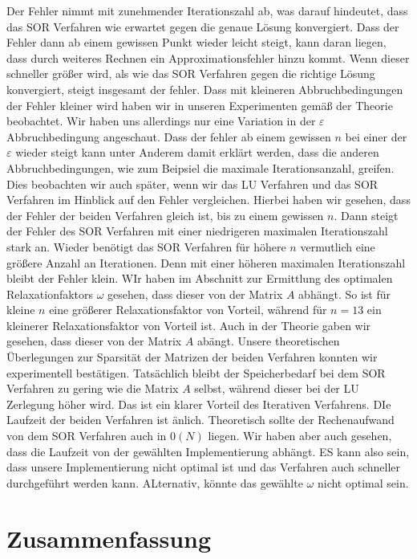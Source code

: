\documentclass[smallheadings]{scrartcl}
\theoremstyle{definition}
\begin{document}
Der Fehler nimmt mit zunehmender Iterationszahl ab, was darauf hindeutet, dass das SOR Verfahren wie erwartet gegen die genaue Lösung konvergiert. Dass der Fehler dann ab einem gewissen Punkt wieder leicht steigt, kann daran liegen, dass durch weiteres Rechnen ein Approximationsfehler hinzu kommt.  Wenn dieser schneller größer wird, als wie das SOR Verfahren gegen die richtige Lösung konvergiert, steigt insgesamt der fehler.  Dass mit kleineren Abbruchbedingungen der Fehler kleiner wird haben wir in unseren Experimenten gemäß der Theorie beobachtet.  Wir haben uns allerdings nur eine Variation in der $\varepsilon$ Abbruchbedingung angeschaut. Dass der fehler ab einem gewissen $n$ bei einer der $\varepsilon$ wieder steigt kann unter Anderem damit erklärt werden, dass die anderen Abbruchbedingungen, wie zum Beipsiel die maximale Iterationsanzahl, greifen. Dies beobachten wir auch später, wenn wir das LU Verfahren und das SOR Verfahren im Hinblick auf den Fehler vergleichen. Hierbei haben wir gesehen, dass der Fehler der beiden Verfahren gleich ist,  bis zu einem gewissen $n$. Dann steigt der Fehler des SOR Verfahren mit einer niedrigeren maximalen Iterationszahl stark an.  Wieder benötigt das SOR Verfahren für höhere $n$ vermutlich eine größere Anzahl an Iterationen. Denn mit einer höheren maximalen Iterationszahl bleibt der Fehler klein. WIr haben im Abschnitt zur Ermittlung des optimalen Relaxationfaktors $\omega$ gesehen, dass dieser von der Matrix $A$ abhängt. So ist für kleine $n$ eine größerer Relaxationsfaktor von Vorteil, während für $n=13$ ein kleinerer Relaxationsfaktor von Vorteil ist. Auch in der Theorie gaben wir gesehen, dass dieser von der Matrix $A$ abängt.  Unsere theoretischen Überlegungen zur Sparsität der Matrizen der beiden Verfahren konnten wir experimentell bestätigen. Tatsächlich bleibt der Speicherbedarf bei dem SOR Verfahren zu gering wie die Matrix $A$ selbst, während dieser bei der LU Zerlegung höher wird. Das ist ein klarer Vorteil des Iterativen Verfahrens. DIe Laufzeit der beiden Verfahren ist änlich. Theoretisch sollte der Rechenaufwand von dem SOR Verfahren auch in $\mathcal{0}(N)$ liegen. Wir haben aber auch gesehen,  dass die Laufzeit von der gewählten Implementierung abhängt. ES kann also sein, dass unsere Implementierung nicht optimal ist und das Verfahren auch schneller durchgeführt werden kann.  ALternativ, könnte das gewählte $\omega $ nicht optimal sein.
\section{Zusammenfassung}
\end{document}
